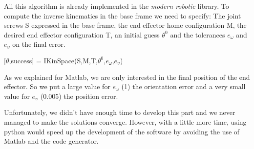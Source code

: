  \bigbreak
 All this algorithm is already implemented in the \textit{modern robotic} library. To compute the inverse kinematics in the base frame we need to specify: The joint screws S expressed in the base frame, the end effector home configuration M, the desired end effector configuration T, an initial guess $\theta^0$ and the tolerances $e_\omega$ and $e_\upsilon$ on the final error.
 \begin{center}
     [$\theta$,success] = IKinSpace(S,M,T,$\theta^0$,$e_\omega$,$e_\upsilon$)
 \end{center}
 
 As we explained for Matlab, we are only interested in the final position of the end effector. So we put a large value for $e_\omega$ (1) the orientation error and a very small value for $e_\upsilon$ (0.005) the position error.
 
 \bigbreak
 Unfortunately, we didn't have enough time to develop this part and we never managed to make the solutions converge. However, with a little more time, using python would speed up the development of the software by avoiding the use of Matlab and the code generator.